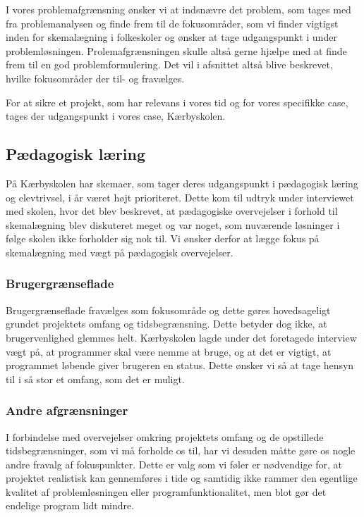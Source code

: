 
I vores problemafgrænsning ønsker vi at indsnævre det problem, som tages med fra problemanalysen og finde frem til de fokusområder, som vi finder vigtigst inden for skemalægning i folkeskoler og ønsker at tage udgangspunkt i under problemløsningen. Prolemafgrænsningen skulle altså gerne hjælpe med at finde frem til en god problemformulering. Det vil i afsnittet altså blive beskrevet, hvilke fokusområder der til- og fravælges.

For at sikre et projekt, som har relevans i vores tid og for vores specifikke case, tages der udgangspunkt i vores case, Kærbyskolen.

\subsection*{Pædagogisk læring}
På Kærbyskolen har skemaer, som tager deres udgangspunkt i pædagogisk læring og elevtrivsel, i år været højt prioriteret. Dette kom til udtryk under interviewet med skolen, hvor det blev beskrevet, at pædagogiske overvejelser i forhold til skemalægning blev diskuteret meget og var noget, som nuværende løsninger i følge skolen ikke forholder sig nok til. Vi ønsker derfor at lægge fokus på skemalægning med vægt på pædagogisk overvejelser.

\subsubsection*{Brugergrænseflade}
Brugergrænseflade fravælges som fokusområde og dette gøres hovedsageligt grundet projektets omfang og tidsbegrænsning. Dette betyder dog ikke, at brugervenlighed glemmes helt. Kærbyskolen lagde under det foretagede interview vægt på, at programmer skal være nemme at bruge, og at det er vigtigt, at programmet løbende giver brugeren en status. Dette ønsker vi så at tage hensyn til i så stor et omfang, som det er muligt.

\subsubsection*{Andre afgrænsninger}
I forbindelse med overvejelser omkring projektets omfang og de opstillede tidsbegrænsninger, som vi må forholde os til, har vi desuden måtte gøre os nogle andre fravalg af fokuspunkter. Dette er valg som vi føler er nødvendige for, at projektet realistisk kan gennemføres i tide og samtidig ikke rammer den egentlige kvalitet af problemløsningen eller programfunktionalitet, men blot gør det endelige program lidt mindre.

